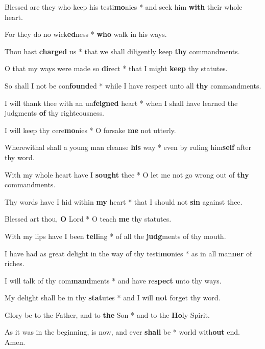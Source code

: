 \begin{multicols}{2}
	Blessed are they who keep his testi\textbf{mo}nies * and seek him \textbf{with} their whole heart.
	
	For they do no wick\textbf{ed}ness * \textbf{who} walk in his ways.
	
	Thou hast \textbf{charged} us * that we shall diligently keep \textbf{thy} commandments.
	
	O that my ways were made so \textbf{di}rect * that I might \textbf{keep} thy statutes.
	
	So shall I not be con\textbf{found}ed * while I have respect unto all \textbf{thy} commandments.
	
	I will thank thee with an un\textbf{feigned} heart * when I shall have learned the judgments \textbf{of} thy righteousness.
	
	I will keep thy cere\textbf{mo}nies * O forsake \textbf{me} not utterly.
	
	Wherewithal shall a young man cleanse \textbf{his} way * even by ruling him\textbf{self} after thy word.
	
	With my whole heart have I \textbf{sought} thee * O let me not go wrong out of \textbf{thy} commandments.
	
	Thy words have I hid within \textbf{my} heart * that I should not \textbf{sin} against thee.
	
	Blessed art thou, \textbf{O} Lord * O teach \textbf{me} thy statutes.
	
	With my lips have I been \textbf{tell}ing * of all the \textbf{judg}ments of thy mouth.
	
	I have had as great delight in the way of thy testi\textbf{mo}nies * as in all man\textbf{ner} of riches.
	
	I will talk of thy com\textbf{mand}ments * and have re\textbf{spect} unto thy ways.
	
	My delight shall be in thy \textbf{stat}utes * and I will \textbf{not} forget thy word.
	
	Glory be to the Father, and to \textbf{the} Son * and to the \textbf{Ho}ly Spirit.
	
	As it was in the beginning, is now, and ever \textbf{shall} be * world with\textbf{out} end. Amen.
\end{multicols}